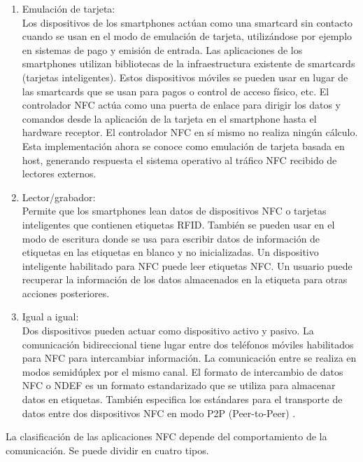 \documentclass[12pt,a4paper,onecolumn,oneside]{report}
\newcounter{subsubsubsection}[subsubsection]
\begin{document}
\begin{enumerate}

\item Emulación de tarjeta:\\
Los dispositivos de los smartphones actúan como una smartcard sin contacto cuando se usan en el modo de emulación de tarjeta,  utilizándose por ejemplo en sistemas de pago y emisión de entrada. Las aplicaciones de los smartphones utilizan bibliotecas de la infraestructura existente de smartcards (tarjetas inteligentes). Estos dispositivos móviles se pueden usar en lugar de las smartcards que se usan para pagos o control de acceso físico, etc. El controlador NFC actúa como una puerta de enlace para dirigir los datos y comandos desde la aplicación de la tarjeta en el smartphone hasta el hardware receptor. El controlador NFC en sí mismo no realiza ningún cálculo. Esta implementación ahora se conoce como emulación de tarjeta basada en host, generando respuesta el sistema operativo al tráfico NFC recibido de lectores externos.

\item Lector/grabador:\\
Permite que los smartphones lean datos de dispositivos NFC o tarjetas inteligentes que contienen etiquetas RFID. También se pueden usar en el modo de escritura donde se usa para escribir datos de información de etiquetas en las etiquetas en blanco y no inicializadas. Un dispositivo inteligente habilitado para NFC puede leer etiquetas NFC. Un usuario puede recuperar la información de los datos almacenados en la etiqueta para otras acciones posteriores.

\item Igual a igual:\\
Dos dispositivos pueden actuar como dispositivo activo y pasivo. La comunicación bidireccional tiene lugar entre dos teléfonos móviles habilitados para NFC para intercambiar información. La comunicación entre se realiza en modos semidúplex por el mismo canal. El formato de intercambio de datos NFC o NDEF \cite{cinco} es un formato estandarizado que se utiliza para almacenar datos en etiquetas. También especifica los estándares para el transporte de datos entre dos dispositivos NFC en modo P2P (Peer-to-Peer) \cite{seis}. 

\end{enumerate}


La clasificación de las aplicaciones NFC depende del comportamiento de la comunicación. Se puede dividir en cuatro tipos.
\end{document}
